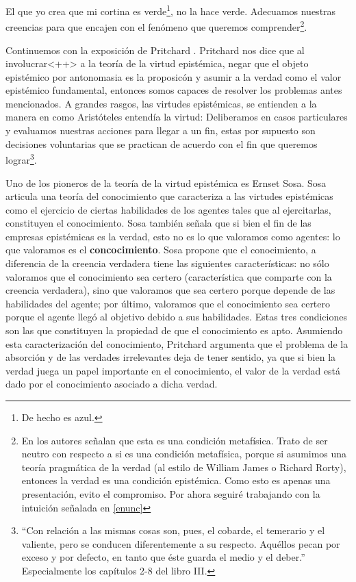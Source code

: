 \documentclass{article}
\begin{document}
El que yo crea que mi cortina es verde\footnote{De hecho es azul.}, no la hace verde. Adecuamos nuestras creencias para que encajen con el fenómeno que queremos comprender\footnote{En \cite{sep-knowledge-analysis} los autores señalan que esta es una condición metafísica. Trato de ser neutro con respecto a si es una condición metafísica, porque si asumimos una teoría pragmática de la verdad (al estilo de William James o Richard Rorty), entonces la verdad es una condición epistémica. Como esto es apenas una presentación, evito el compromiso. Por ahora seguiré trabajando con la intuición señalada en \ref{enunc}}.  

Continuemos con la exposición de Pritchard \cite{Pritchard2021}. Pritchard nos dice que al involucrar<++> a la teoría de la virtud epistémica, negar que el objeto epistémico por antonomasia es la proposicón y asumir a la verdad como el valor epistémico fundamental, entonces somos capaces de resolver los problemas antes mencionados. A grandes rasgos, las virtudes epistémicas, se entienden a la manera en como Aristóteles entendía la virtud: Deliberamos en casos particulares y evaluamos nuestras acciones para llegar a un fin, estas por supuesto son decisiones voluntarias que se practican de acuerdo con el fin que queremos lograr\footnote{``Con relación a las mismas cosas son, pues, el cobarde, el temerario y el valiente, pero se conducen diferentemente a su respecto. Aquéllos pecan por exceso y por defecto, en tanto que éste guarda el medio y el deber.'' \cite{aristotelesnico} Especialmente los capítulos 2-8 del libro III.}. 

Uno de los pioneros de la teoría de la virtud epistémica es Ernset Sosa. Sosa \citeyear{Sosa2017-SOSE} articula una teoría del conocimiento que caracteriza a las virtudes epistémicas como el ejercicio de ciertas habilidades de los agentes tales que al ejercitarlas, constituyen el conocimiento. Sosa también señala que si bien el fin de las empresas epistémicas es la verdad, esto no es lo que valoramos como agentes: lo que valoramos es el \textbf{concocimiento}. Sosa \citeyear[pp. 11-113]{Sosa2017-SOSE} propone que el conocimiento, a diferencia de la creencia verdadera tiene las siguientes características: no sólo valoramos que el conocimiento sea certero (característica que comparte con la creencia verdadera), sino que valoramos que sea certero porque depende de las habilidades del agente; por último, valoramos que el conocimiento sea certero porque el agente llegó al objetivo debido a sus habilidades. Estas tres condiciones son las que constituyen la propiedad de que el conocimiento es apto. Asumiendo esta caracterización del conocimiento, Pritchard argumenta que el problema de la absorción y de las verdades irrelevantes deja de tener sentido, ya que si bien la verdad juega un papel importante en el conocimiento, el valor de la verdad está dado por el conocimiento asociado a dicha verdad.
\end{document}
